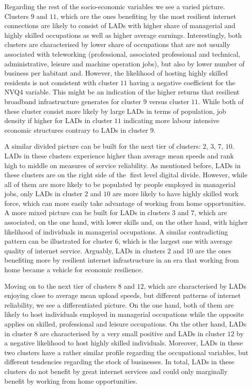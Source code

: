 \documentclass[Royal,times,sageh]{sagej}
\begin{document}
Regarding the rest of the socio-economic variables we see a varied
picture. Clusters \(9\) and \(11\), which are the ones benefiting by the
most resilient internet connections are likely to consist of LADs with
higher share of managerial and highly skilled occupations as well as
higher average earnings. Interestingly, both clusters are characterised
by lower share of occupations that are not usually associated with
teleworking (professional, associated professional and technical,
administrative, leisure and machine operation jobs), but also by lower
number of business per habitant and. However, the likelihood of hosting
highly skilled residents is not consistent with cluster \(11\) having a
negative coefficient for the NVQ4 variable. This might be an indication
of the higher returns that resilient broadband infrastructure generates
for cluster \(9\) versus cluster \(11\). While both of these cluster
consist more likely by large LADs in terms of population, job density if
higher for LADs in cluster \(11\) indicating more labour intensive
economic structures contrary to LADs in cluster \(9\).

A similar divided picture can be built for the next tier of clusters:
\(2\), \(3\), \(7\), \(10\). LADs in these clusters experience higher
than average mean speeds and rank high to middle on measures of service
reliability. As mentioned before, LADs in these clusters are on the
right side of the first level digital divide. However, while all of
them are more likely to be populated by people employed in managerial
jobs, only LADs in cluster \(2\) and \(10\) are more likely to have
highly skilled work force, which can more easily take advantage of
working from home opportunities. A more mixed picture can be built for
LADs in clusters \(3\) and \(7\), which are associated, on the one hand,
with lower skills and, on the other hand, with higher likelihood of
individuals in managerial occupations. A similar contradicting pattern
can be illustrated for cluster \(6\), which is the largest one with
average quality of internet service. Arguably, LADs in clusters \(2\)
and \(10\) are the ones benefiting more by resilient internet
infrastructure in an era that working from home became a vehicle for
economic resilience.

Moving on to the next tier of clusters \(8\) and \(12\), which are
characterised by LADs enjoying close to average mean upload speeds, but
different patterns of internet reliability, we see a differentiated
picture. On the one hand, both of them are likely to host individuals
employed in managerial occupations while the opposite applies on
skilled, professional and leisure occupations. On the other hand, LADs
in cluster \(8\) are characterised by a very small positive and LADs in
cluster \(12\) by a negative likelihood to host highly skilled
individuals. Moreover, LADs in these two clusters have a rather similar
profile regarding the occupational variables, but different tendencies
regarding the stock of businesses. In total, LADs in these clusters do
not benefit by great internet services and could only marginally benefit
by working from home opportunities.
\end{document}
